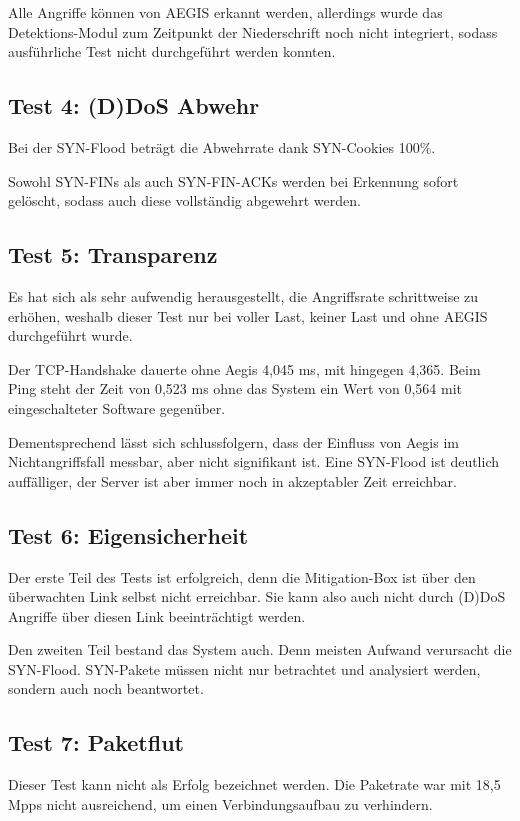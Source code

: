 \documentclass[../review_3.tex]{subfiles}
\begin{document}
    Alle Angriffe können von AEGIS erkannt werden, allerdings wurde das Detektions-Modul zum Zeitpunkt der Niederschrift noch nicht integriert, sodass ausführliche Test nicht durchgeführt werden konnten.

\subsection{Test 4: (D)DoS Abwehr}
    Bei der SYN-Flood beträgt die Abwehrrate dank SYN-Cookies 100\%.
    
    Sowohl SYN-FINs als auch SYN-FIN-ACKs werden bei Erkennung sofort gelöscht, sodass auch diese vollständig abgewehrt werden.

\subsection{Test 5: Transparenz}
    Es hat sich als sehr aufwendig herausgestellt, die Angriffsrate schrittweise zu erhöhen, weshalb dieser Test nur bei voller Last, keiner Last und ohne AEGIS durchgeführt wurde.
    
    Der TCP-Handshake dauerte ohne Aegis 4,045 ms, mit hingegen 4,365. Beim Ping steht der Zeit von 0,523 ms ohne das System ein Wert von 0,564 mit eingeschalteter Software gegenüber.
    
    Dementsprechend lässt sich schlussfolgern, dass der Einfluss von Aegis im Nichtangriffsfall messbar, aber nicht signifikant ist.
    Eine SYN-Flood ist deutlich auffälliger, der Server ist aber immer noch in akzeptabler Zeit erreichbar.

\subsection{Test 6: Eigensicherheit}
    Der erste Teil des Tests ist erfolgreich, denn die Mitigation-Box ist über den überwachten Link selbst nicht erreichbar. 
    Sie kann also auch nicht durch (D)DoS Angriffe über diesen Link beeinträchtigt werden.
    
    Den zweiten Teil bestand das System auch. Denn meisten Aufwand verursacht die SYN-Flood. 
    SYN-Pakete müssen nicht nur betrachtet und analysiert werden, sondern auch noch beantwortet.

\subsection{Test 7: Paketflut}
    Dieser Test kann nicht als Erfolg bezeichnet werden. Die Paketrate war mit 18,5 Mpps nicht ausreichend, um einen Verbindungsaufbau zu verhindern.
\end{document}
